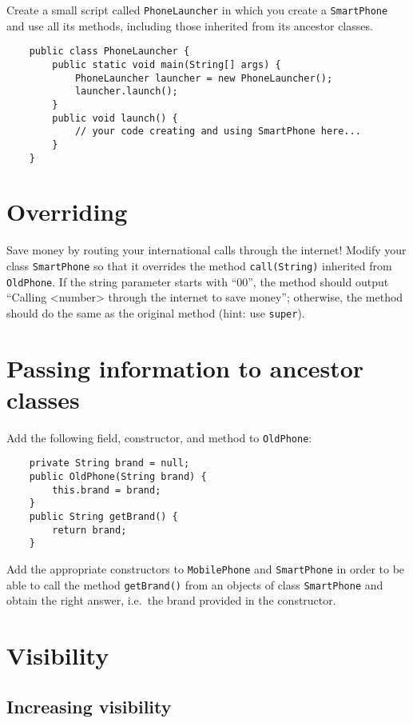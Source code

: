 \documentclass{article}
\begin{document}
Create a small script called \verb+PhoneLauncher+ 
in which you create a \verb+SmartPhone+ and use
all its methods, including those inherited from its ancestor classes. 

\begin{verbatim}
    public class PhoneLauncher {
        public static void main(String[] args) {
            PhoneLauncher launcher = new PhoneLauncher();
            launcher.launch();
        }
        public void launch() {
            // your code creating and using SmartPhone here...
        }
    }
\end{verbatim}

\section{Overriding}
\label{sec:overriding}

Save money by routing your international calls through the internet!
Modify your class \verb+SmartPhone+ so that it overrides the method
\verb+call(String)+ inherited from \verb+OldPhone+. If the string
parameter starts with ``00'', the method should output ``Calling
<number> through the internet to save money''; otherwise, the method
should do the same as the original method (hint: use \verb+super+). 

\section{Passing information to ancestor classes}
\label{sec:pass-inform-ancest}

Add the following field, constructor, and method to \verb+OldPhone+: 

\begin{verbatim}
    private String brand = null;
    public OldPhone(String brand) {
        this.brand = brand;
    }
    public String getBrand() {
        return brand;
    }
\end{verbatim}

Add the appropriate constructors to \verb+MobilePhone+ and
\verb+SmartPhone+ in order to be able to call the method
\verb+getBrand()+ from an objects of class \verb+SmartPhone+ and
obtain the right answer, i.e.~the brand provided in the constructor. 

\section{Visibility}
\label{sec:visibility}

\subsection{Increasing visibility}
\label{sec:incr-visib}
\end{document}
